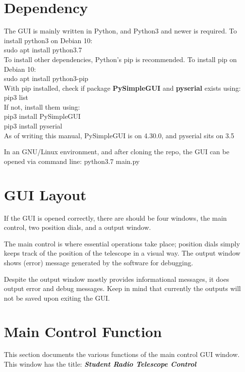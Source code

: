 \documentclass{article}
\begin{document}
\section{Dependency}

The GUI is mainly written in Python, and Python3 and newer is required. To install python3 on Debian 10:\\
sudo apt install python3.7\\

To install other dependencies, Python's pip is recommended. To install pip on Debian 10:\\
sudo apt install python3-pip\\

With pip installed, check if package \textbf{PySimpleGUI} and \textbf{pyserial} exists using:\\
pip3 list\\

If not, install them using:\\
pip3 install PySimpleGUI\\
pip3 install pyserial\\

As of writing this manual, PySimpleGUI is on 4.30.0, and pyserial sits on 3.5

In an GNU/Linux environment, and after cloning the repo, the GUI can be opened via command line: python3.7 main.py

\section{GUI Layout}

If the GUI is opened correctly, there are should be four windows, the main control, two position dials, and a output window.

The main control is where essential operations take place; position dials simply keeps track of the position of the telescope in a visual way. The output window shows (error) message generated by the software for debugging.

Despite the output window mostly provides informational messages, it does output error and debug messages. Keep in mind that currently the outputs will not be saved upon exiting the GUI.

\section{Main Control Function}
This section documents the various functions of the main control GUI window. This window has the title: \textbf{\textit{Student Radio Telescope Control}}
\end{document}
